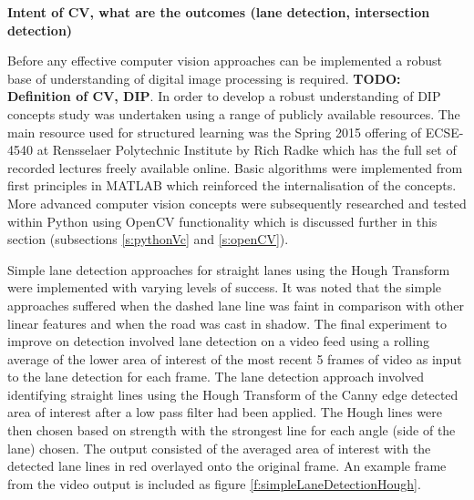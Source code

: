 \documentclass[]{aiaa-tc}%
\begin{document}
\textbf{Intent of CV, what are the outcomes (lane detection, intersection detection)}

Before any effective computer vision approaches can be implemented a robust base of understanding of digital image processing is required. \textbf{TODO: Definition of CV, DIP}. In order to develop a robust understanding of DIP concepts study was undertaken using a range of publicly available resources. The main resource used for structured learning was the Spring 2015 offering of ECSE-4540 at Rensselaer Polytechnic Institute by Rich Radke which has the full set of recorded lectures freely available online. Basic algorithms were implemented from first principles in MATLAB which reinforced the internalisation of the concepts. More advanced computer vision concepts were subsequently researched and tested within Python using OpenCV functionality which is discussed further in this section (subsections \ref{s:pythonVc} and \ref{s:openCV}). 

Simple lane detection approaches for straight lanes using the Hough Transform were implemented with varying levels of success. It was noted that the simple approaches suffered when the dashed lane line was faint in comparison with other linear features and when the road was cast in shadow. The final experiment to improve on detection involved lane detection on a video feed using a rolling average of the lower area of interest of the most recent 5 frames of video as input to the lane detection for each frame. The lane detection approach involved identifying straight lines using the Hough Transform of the Canny edge detected area of interest after a low pass filter had been applied. The Hough lines were then chosen based on strength with the strongest line for each angle (side of the lane) chosen. The output consisted of the averaged area of interest with the detected lane lines in red overlayed onto the original frame. An example frame from the video output is included as figure \ref{f:simpleLaneDetectionHough}.

\end{document}
